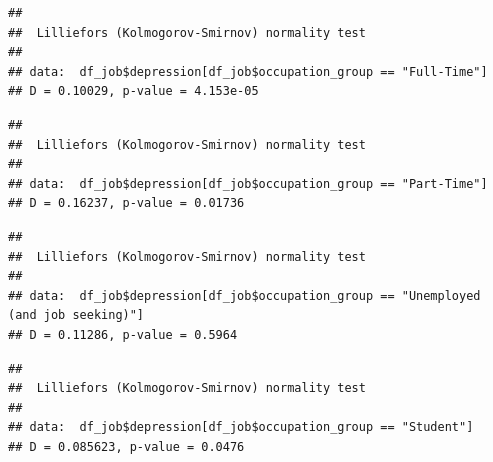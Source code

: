 \documentclass[
]{article}
\newenvironment{Shaded}{\begin{snugshade}}{\end{snugshade}}
\newcommand{\FunctionTok}[1]{\textcolor[rgb]{0.13,0.29,0.53}{\textbf{#1}}}
\newcommand{\NormalTok}[1]{#1}
\newcommand{\SpecialCharTok}[1]{\textcolor[rgb]{0.81,0.36,0.00}{\textbf{#1}}}
\newcommand{\StringTok}[1]{\textcolor[rgb]{0.31,0.60,0.02}{#1}}
\begin{document}
\begin{verbatim}
## 
##  Lilliefors (Kolmogorov-Smirnov) normality test
## 
## data:  df_job$depression[df_job$occupation_group == "Full-Time"]
## D = 0.10029, p-value = 4.153e-05
\end{verbatim}

\begin{Shaded}
\end{Shaded}

\begin{verbatim}
## 
##  Lilliefors (Kolmogorov-Smirnov) normality test
## 
## data:  df_job$depression[df_job$occupation_group == "Part-Time"]
## D = 0.16237, p-value = 0.01736
\end{verbatim}

\begin{Shaded}
\end{Shaded}

\begin{verbatim}
## 
##  Lilliefors (Kolmogorov-Smirnov) normality test
## 
## data:  df_job$depression[df_job$occupation_group == "Unemployed (and job seeking)"]
## D = 0.11286, p-value = 0.5964
\end{verbatim}

\begin{Shaded}
\end{Shaded}

\begin{verbatim}
## 
##  Lilliefors (Kolmogorov-Smirnov) normality test
## 
## data:  df_job$depression[df_job$occupation_group == "Student"]
## D = 0.085623, p-value = 0.0476
\end{verbatim}
\end{document}
